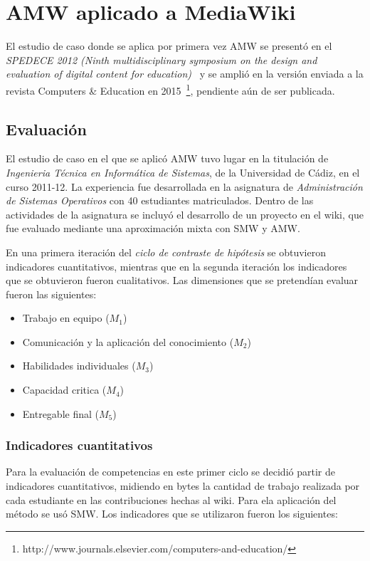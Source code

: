\section{AMW aplicado a MediaWiki}

El estudio de caso donde se aplica por primera vez AMW se presentó en el \emph{SPEDECE 2012 (Ninth multidisciplinary symposium on the design and evaluation of digital content for education)}~\cite{Balderas:2012} y se amplió en la versión enviada a la revista Computers \& Education en 2015~\footnote{http://www.journals.elsevier.com/computers-and-education/}, pendiente aún de ser publicada.

\subsection{Evaluación}

El estudio de caso en el que se aplicó AMW tuvo lugar en la titulación de \emph{Ingenieria Técnica en Informática de Sistemas},  de la Universidad de Cádiz, en el curso 2011-12. La experiencia fue desarrollada en la asignatura de \emph{Administración de Sistemas Operativos} con 40 estudiantes matriculados. Dentro de las actividades de la asignatura se incluyó el desarrollo de un proyecto en el wiki, que fue evaluado mediante una aproximación mixta con SMW y AMW.

En una primera iteración del \emph{ciclo de contraste de hipótesis} se obtuvieron indicadores cuantitativos, mientras que en la segunda iteración los indicadores que se obtuvieron fueron cualitativos. 
Las dimensiones que se pretendían evaluar fueron las siguientes:

\begin{itemize}
	\item Trabajo en equipo ($M_1$)
	\item Comunicación y la aplicación del conocimiento ($M_2$)
	\item Habilidades individuales ($M_3$)
	\item Capacidad critica ($M_4$)
	\item Entregable final ($M_5$)
\end{itemize}

\subsubsection{Indicadores cuantitativos}

Para la evaluación de competencias en este primer ciclo se decidió partir de indicadores cuantitativos, midiendo en bytes la cantidad de trabajo realizada por cada estudiante en las contribuciones hechas al wiki. Para ela aplicación del método se usó SMW. Los indicadores que se utilizaron fueron los siguientes:

